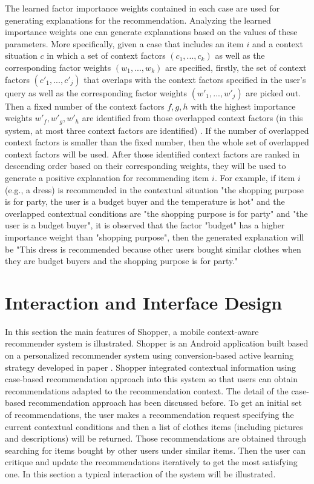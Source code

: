 The learned factor importance weights contained in each case are used for generating explanations for the recommendation.  Analyzing the learned importance weights one can generate explanations based on the values of these parameters. More specifically, given a case that includes an item $i$ and a context situation $c$ in which a set of context factors $(c_1, ..., c_k)$ as well as the corresponding factor weights $(w_1, ..., w_k)$ are specified, firstly, the set of context factors $(c\prime_1, ..., c\prime_j)$ that overlaps with the context factors specified in the user's query as well as the corresponding factor weights $(w\prime_1, ..., w\prime_j)$ are picked out. Then a fixed number of the context factors $f, g, h$ with the highest importance weights $w\prime_f, w\prime_g, w\prime_h$ are identified from those overlapped context factors (in this system, at most three context factors are identified) . If the number of overlapped context factors is smaller than the fixed number, then the whole set of overlapped context factors will be used. After those identified context factors are ranked in descending order based on their corresponding weights, they will be used to generate a positive explanation for recommending item $i$. For example, if item $i$ (e.g., a dress) is recommended in the contextual situation "the shopping purpose is for party, the user is a budget buyer and the temperature is hot" and the overlapped contextual conditions are "the shopping purpose is for party" and "the user is a budget buyer", it is observed that the factor "budget" has a higher importance weight than "shopping purpose", then the generated explanation will be "This dress is recommended because other users bought similar clothes when they are budget buyers and the shopping purpose is for party."

\section{Interaction and Interface Design} \label{sec:eg}

In this section the main features of Shopper, a mobile context-aware recommender system is illustrated. Shopper is an Android application built based on a personalized recommender system using conversion-based active learning strategy developed in paper \cite{ref:30}. Shopper integrated contextual information using case-based recommendation approach into this system so that users can obtain recommendations adapted to the recommendation context. The detail of the case-based recommendation approach has been discussed before. To get an initial set of recommendations, the user makes a recommendation request specifying the current contextual conditions and then a list of clothes items (including pictures and descriptions) will be returned. Those recommendations are obtained through searching for items bought by other users under similar items. Then the user can critique and update the recommendations iteratively to get the most satisfying one. In this section a typical interaction of the system will be illustrated.

